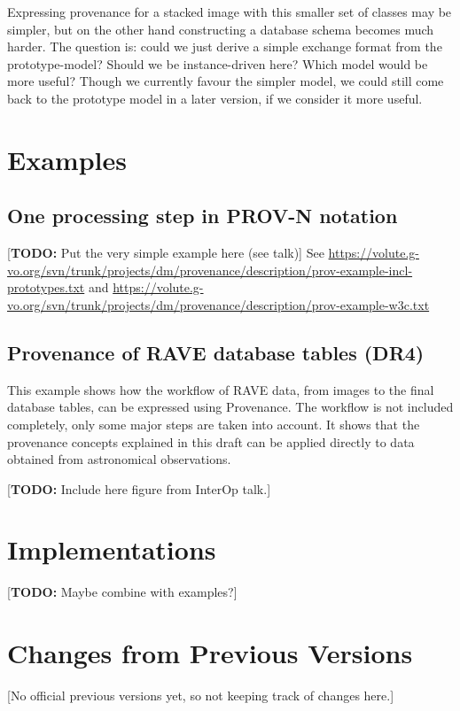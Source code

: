 \documentclass[11pt,a4paper]{ivoa}
\newcommand{\TODO}[1]{\noindent \textcolor{todocolor}{[\textbf{TODO:} #1]}}
\begin{document}
Expressing provenance for a stacked image with this smaller set of classes may be simpler, but on the other hand constructing a database schema becomes much harder. 
The question is: could we just derive a simple exchange format from the prototype-model? Should we be instance-driven here? Which model would be more useful?
Though we currently favour the simpler model, we could still come back to the prototype model in a later version, if we consider it more useful.



\section{Examples}\label{sec:examples}

\subsection{One processing step in PROV-N notation}
\TODO{Put the very simple example here (see talk)}
See \url{https://volute.g-vo.org/svn/trunk/projects/dm/provenance/description/prov-example-incl-prototypes.txt}
and \url{https://volute.g-vo.org/svn/trunk/projects/dm/provenance/description/prov-example-w3c.txt}


\subsection{Provenance of RAVE database tables (DR4)}
This example shows how the workflow of RAVE data, from images to the final database tables, can be expressed using Provenance. 
The workflow is not included completely, only some major steps are taken into account. It shows that the provenance concepts explained in this draft can be applied directly to data obtained from astronomical observations.

\TODO{Include here figure from InterOp talk.}



\section{Implementations}
\TODO{Maybe combine with examples?}


\appendix
\section{Changes from Previous Versions}
[No official previous versions yet, so not keeping track of changes here.]



\end{document}
